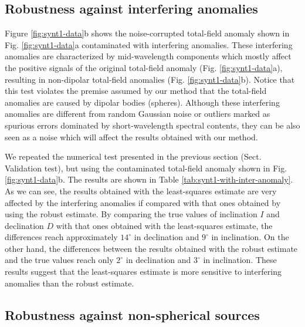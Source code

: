 \documentclass[journal abbreviation, npg]{copernicus}
\begin{document}
\subsection{Robustness against interfering anomalies}

Figure \ref{fig:synt1-data}b shows the noise-corrupted total-field anomaly shown in Fig. \ref{fig:synt1-data}a contaminated with interfering anomalies. These interfering anomalies are characterized by mid-wavelength components which mostly affect the positive signals of the original total-field anomaly (Fig. \ref{fig:synt1-data}a), resulting in non-dipolar total-field anomalies (Fig. \ref{fig:synt1-data}b). Notice that this test violates the premise assumed by our method that the total-field anomalies are caused by dipolar bodies (spheres). Although these interfering anomalies are different from random Gaussian noise or outliers marked as spurious errors dominated by short-wavelength spectral contents, they can be also seen as a noise which will affect the results obtained with our method.

We repeated the numerical test presented in the previous section (Sect. Validation test), but using the contaminated total-field anomaly shown in Fig. \ref{fig:synt1-data}b. The results are shown in Table \ref{tab:synt1-with-inter-anomaly}. As we can see, the results obtained with the least-squares estimate are very affected by the interfering anomalies if compared with that ones obtained by using the robust estimate. By comparing the true values of inclination $I$ and declination $D$ with that ones obtained with the least-squares estimate, the differences reach approximately $14^{\circ}$ in declination and $9^{\circ}$ in inclination. On the other hand, the differences between the results obtained with the robust estimate and the true values reach only $2^{\circ}$ in declination and $3^{\circ}$ in inclination. These results suggest that the least-squares estimate is more sensitive to interfering anomalies than the robust estimate.

\subsection{Robustness against non-spherical sources}
\end{document}
